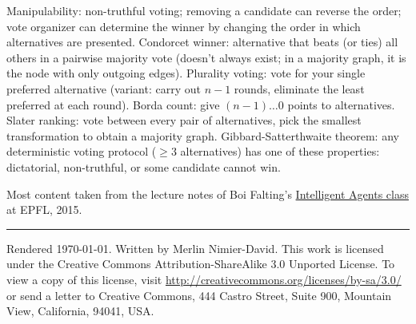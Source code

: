 \documentclass[10pt,a4paper,landscape]{article}
\newcommand{\concept}[1]{\textcolor{Emerald}{#1}} %
\renewcommand{\section}[1]{
  \vspace{-0.3cm}
  \begin{center}
    \color{Bittersweet}
    \hrulefill{\small~~#1~~}\hrulefill
  \end{center}
  \vspace{-0.3cm}
}
\renewcommand{\subsection}[1]{\section{#1}}
\begin{document}
\begin{multicols*}{4}
\concept{Manipulability}: non-truthful voting; removing a candidate can reverse the order; vote organizer can determine the winner by changing the order in which alternatives are presented.
\concept{Condorcet winner}: alternative that beats (or ties) all others in a pairwise majority vote (doesn't always exist; in a majority graph, it is the node with only outgoing edges).
\concept{Plurality voting}: vote for your single preferred alternative (variant: carry out $n - 1$ rounds, eliminate the least preferred at each round).
\concept{Borda count}: give $(n - 1) \dots 0$ points to alternatives.
\concept{Slater ranking}: vote between every pair of alternatives, pick the smallest transformation to obtain a majority graph.
\concept{Gibbard-Satterthwaite theorem}: any deterministic voting protocol ($\geq 3$ alternatives) has one of these properties: dictatorial, non-truthful, or some candidate cannot win.

\newpage



\section{Credits}
Most content taken from the lecture notes of Boi Falting's \href{http://edu.epfl.ch/coursebook/en/intelligent-agents-CS-430}{Intelligent Agents class} at EPFL, 2015.

\vspace{0.5cm}
\hrule
\vspace{0.5cm}
\tiny
Rendered \today. Written by Merlin Nimier-David.
This work is licensed under the Creative Commons Attribution-ShareAlike 3.0 Unported License.
To view a copy of this license, visit \href{http://creativecommons.org/licenses/by-sa/3.0/}{http://creativecommons.org/licenses/by-sa/3.0/} or
send a letter to Creative Commons, 444 Castro Street, Suite 900, Mountain View, California, 94041, USA.
\end{multicols*}
\end{document}
